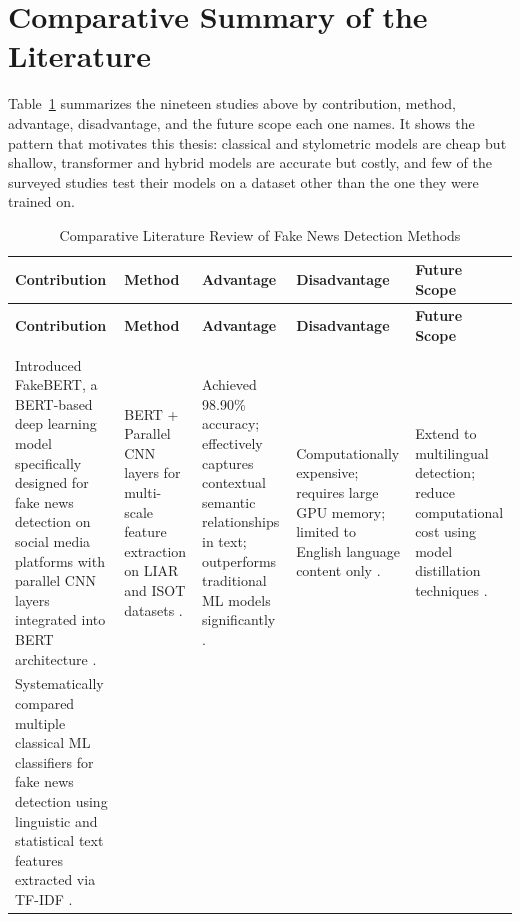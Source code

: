 \section{Comparative Summary of the Literature}

Table~\ref{tab:litreview} summarizes the nineteen studies above by contribution, method, advantage, disadvantage, and the future scope each one names. It shows the pattern that motivates this thesis: classical and stylometric models are cheap but shallow, transformer and hybrid models are accurate but costly, and few of the surveyed studies test their models on a dataset other than the one they were trained on.

{\footnotesize
\begin{longtable}{|>{\raggedright\arraybackslash}p{}|>{\raggedright\arraybackslash}p{}|>{\raggedright\arraybackslash}p{}|>{\raggedright\arraybackslash}p{}|>{\raggedright\arraybackslash}p{}|}
\caption{Comparative Literature Review of Fake News Detection Methods} \label{tab:litreview} \\
\hline
\textbf{Contribution} & \textbf{Method} & \textbf{Advantage} & \textbf{Disadvantage} & \textbf{Future Scope} \\ \hline
\endfirsthead
\hline
\textbf{Contribution} & \textbf{Method} & \textbf{Advantage} & \textbf{Disadvantage} & \textbf{Future Scope} \\ \hline
\endhead
\hline
\multicolumn{5}{r}{\small\textit{Continued on next page\ldots}} \\
\endfoot
\hline
\endlastfoot
Introduced FakeBERT, a BERT-based deep learning model specifically designed for fake news detection on social media platforms with parallel CNN layers integrated into BERT architecture \citep{Kaliyar2021FakeBERT}. &
BERT + Parallel CNN layers for multi-scale feature extraction on LIAR and ISOT datasets \citep{Kaliyar2021FakeBERT}. &
Achieved 98.90\% accuracy; effectively captures contextual semantic relationships in text; outperforms traditional ML models significantly \citep{Kaliyar2021FakeBERT}. &
Computationally expensive; requires large GPU memory; limited to English language content only \citep{Kaliyar2021FakeBERT}. &
Extend to multilingual detection; reduce computational cost using model distillation techniques \citep{Kaliyar2021FakeBERT}. \\ \hline
Systematically compared multiple classical ML classifiers for fake news detection using linguistic and statistical text features extracted via TF-IDF \citep{Aphiwongsophon2021Detecting}. &

\end{longtable}}
